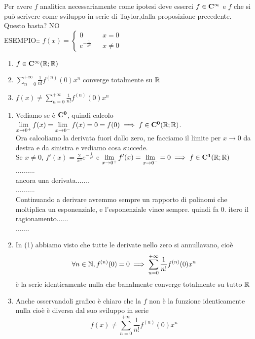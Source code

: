 Per avere $f$ analitica  necessariamente come ipotesi deve esserci $f\in \cntclass{\infty}$ e $f$ che si può scrivere come sviluppo in serie di Taylor,dalla proposizione precedente. Questo basta? NO\\
ESEMPIO:: $f(x)=\left\{\begin{matrix}0&& x=0\\e^{-\frac{1}{x^2}}&&x\ne 0\end{matrix}\right.$
\begin{center}
	\begin{tikzpicture}[scale=1]
	\end{tikzpicture}
\end{center}
\begin{enumerate}
	\item $f\in \cntclass{\infty}( \R; \R)$
	\item $\sum\limits_{n=0}^{+\infty}\frac{1}{n!}f^{(n)}(0)x^n$ converge totalmente su $ \R$
	\item $f(x)\ne\sum\limits_{n=0}^{+\infty}\frac{1}{n!}f^{(n)}(0)x^n$
\end{enumerate}
\begin{enumerate}
	\item Vediamo se è $\cntclass{0}$, quindi calcolo $\lim\limits_{x\to 0^{+}}f(x)=\lim\limits_{x\to 0^{-}}f(x)=0=f(0)\implies f\in \cntclass{0}( \R; \R)$.\\
	Ora calcoliamo la derivata fuori dallo zero, ne facciamo il limite per $x\to 0$ da destra e da sinistra e vediamo cosa succede.\\
	Se $x\ne 0$, $f'(x)=\frac{2}{x^3}e^{-\frac{1}{x^3}}$ e $\lim\limits_{x\to 0^{+}}f'(x)=\lim\limits_{x\to 0^{-}} = 0 \implies f\in \cntclass{1}( \R; \R)$\\
	..........\\
	ancora una derivata.......\\
	..........\\
	Continuando a derivare  avremmo sempre un rapporto di polinomi che moltiplica un esponenziale, e l'esponenziale vince sempre. quindi fa $0$.
	itero il ragionamento......\\
	.......\\
	\item In (1) abbiamo visto  che tutte le derivate nello zero si annullavano, cioè
	\[\forall n\in\N, f^{(n)}(0)=0 \implies \sum\limits_{n=0}^{+\infty}\frac{1}{n!}f^{(n)}(0)x^n\]
	è la serie identicamente nulla  che banalmente converge totalmente su tutto $ \R$
	\item Anche osservandoli grafico è chiaro che la $f$ non è la funzione identicamente nulla cioè è diversa dal suo sviluppo in serie
	\[f(x)\ne\sum\limits_{n=0}^{+\infty}\frac{1}{n!}f^{(n)}(0)x^n\]
\end{enumerate}
